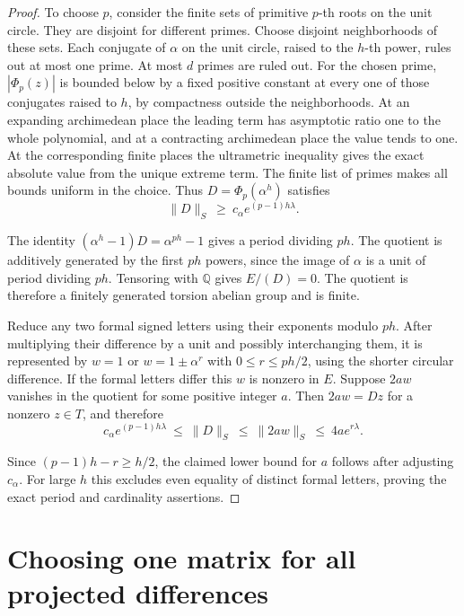 \documentclass[11pt,letterpaper]{article}
\numberwithin{equation}{section}
\begin{document}
\begin{proof}

To choose $p$, consider the finite sets of primitive $p$-th roots on the unit circle. They are
disjoint for different primes. Choose disjoint neighborhoods of these sets. Each conjugate of
$\alpha$ on the unit circle, raised to the $h$-th power, rules out at most one prime. At most
$d$ primes are ruled out. For the chosen prime, $|\Phi_p(z)|$ is bounded below by a fixed
positive constant at every one of those conjugates raised to $h$, by compactness outside the
neighborhoods. At an expanding archimedean place the leading term has asymptotic ratio one to
the whole polynomial, and at a contracting archimedean place the value tends to one. At the
corresponding finite places the ultrametric inequality gives the exact absolute value from the
unique extreme term. The finite list of primes makes all bounds uniform in the choice. Thus
$D=\Phi_p(\alpha^h)$ satisfies
\[
\|D\|_S\ \ge\ c_\alpha e^{(p-1)h\lambda}.
\]

The identity $(\alpha^h-1)D=\alpha^{ph}-1$ gives a period dividing $ph$. The quotient is
additively generated by the first $ph$ powers, since the image of $\alpha$ is a unit of period
dividing $ph$. Tensoring with $\mathbb Q$ gives $E/(D)=0$. The quotient is therefore a
finitely generated torsion abelian group and is finite.

Reduce any two formal signed letters using their exponents modulo $ph$. After multiplying
their difference by a unit and possibly interchanging them, it is represented by $w=1$ or
$w=1\pm\alpha^r$ with $0\le r\le ph/2$, using the shorter circular difference. If the formal
letters differ this $w$ is nonzero in $E$. Suppose $2a w$ vanishes in the quotient for some
positive integer $a$. Then $2aw=Dz$ for a nonzero $z\in T$, and therefore
\[
c_\alpha e^{(p-1)h\lambda}
\ \le\ \|D\|_S\ \le\ \|2aw\|_S\ \le\ 4a e^{r\lambda}.
\]

Since $(p-1)h-r\ge h/2$, the claimed lower bound for $a$ follows after adjusting $c_\alpha$.
For large $h$ this excludes even equality of distinct formal letters, proving the exact period
and cardinality assertions.
\end{proof}

\section{Choosing one matrix for all projected differences}\label{sec:count}
\end{document}
